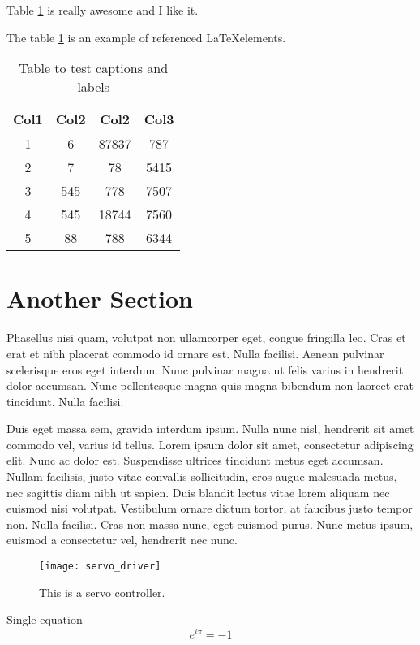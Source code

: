 Table \ref{table:1} is really awesome and I like it.

The table \ref{table:1} is an example of referenced \LaTeX elements.
 
\begin{table}[h!]
\centering
\caption{Table to test captions and labels}
\begin{tabular}{||c c c c||} 
 \hline
 Col1 & Col2 & Col2 & Col3 \\ [0.5ex] 
 \hline\hline
 1 & 6 & 87837 & 787 \\ 
 2 & 7 & 78 & 5415 \\
 3 & 545 & 778 & 7507 \\
 4 & 545 & 18744 & 7560 \\
 5 & 88 & 788 & 6344 \\ [1ex] 
 \hline
\end{tabular}
\label{table:1}
\end{table}

\section{Another Section}

Phasellus nisi quam, volutpat non ullamcorper eget, congue fringilla leo. Cras et erat et nibh placerat commodo id ornare est. Nulla facilisi. Aenean pulvinar scelerisque eros eget interdum. Nunc pulvinar magna ut felis varius in hendrerit dolor accumsan. Nunc pellentesque magna quis magna bibendum non laoreet erat tincidunt. Nulla facilisi.

Duis eget massa sem, gravida interdum ipsum. Nulla nunc nisl, hendrerit sit amet commodo vel, varius id tellus. Lorem ipsum dolor sit amet, consectetur adipiscing elit. Nunc ac dolor est. Suspendisse ultrices tincidunt metus eget accumsan. Nullam facilisis, justo vitae convallis sollicitudin, eros augue malesuada metus, nec sagittis diam nibh ut sapien. Duis blandit lectus vitae lorem aliquam nec euismod nisi volutpat. Vestibulum ornare dictum tortor, at faucibus justo tempor non. Nulla facilisi. Cras non massa nunc, eget euismod purus. Nunc metus ipsum, euismod a consectetur vel, hendrerit nec nunc.

\begin{figure}
    \centering
    \texttt{[image: servo\_driver]}
    \caption{This is a servo controller.}
    \label{fig:servo_driver}
\end{figure}

Single equation
\begin{equation}
    e^{i\pi} = -1
\end{equation}

